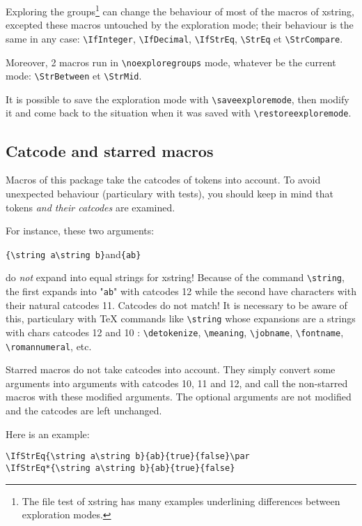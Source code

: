 \documentclass[english,a4paper,10pt]{article}
\newcommand\Xstring{\textsf{xstring}\xspace}
\newcommand\styleexercice{\footnotesize}
\newcommand\verbinline{\lstinline[basicstyle=\normalsize\ttfamily]}
\begin{document}
Exploring the groups\footnote{The file test of \Xstring has many examples underlining differences between exploration modes.} can change the behaviour of most of the macros of \Xstring, excepted these macros untouched by the exploration mode; their behaviour is the same in any case: \verbinline|\IfInteger|, \verbinline|\IfDecimal|, \verbinline|\IfStrEq|, \verbinline|\StrEq| et \verbinline|\StrCompare|.

Moreover, 2 macros run in \verbinline|\noexploregroups| mode, whatever be the current mode: \verbinline|\StrBetween| et \verbinline|\StrMid|.\medskip

It is possible to save the exploration mode with \verbinline|\saveexploremode|, then modify it and come back to the situation when it was saved with \verbinline|\restoreexploremode|.

\subsection{Catcode and starred macros}
\label{macrosetoilees}
Macros of this package take the catcodes of tokens into account. To avoid unexpected behaviour (particulary with tests), you should keep in mind that tokens \emph{and their catcodes} are examined.\medskip

For instance, these two arguments:\par\medskip
\hfil\verbinline|{\string a\string b}|\qquad and\qquad\verb|{ab}|\hfil{}\par\smallskip
do \emph{not} expand into equal strings for xstring! Because of the command \verbinline|\string|, the first expands into "\verb|ab|" with catcodes 12 while the second have characters with their natural catcodes 11. Catcodes do not match! It is necessary to be aware of this, particulary with \TeX{} commands like \verbinline|\string| whose expansions are a strings with chars catcodes 12 and 10 : \verbinline|\detokenize|, \verbinline|\meaning|, \verbinline|\jobname|, \verbinline|\fontname|, \verbinline|\romannumeral|, etc.\medskip

Starred macros do not take catcodes into account. They simply convert some arguments into arguments with catcodes 10, 11 and 12, and call the non-starred macros with these modified arguments. The optional arguments are not modified and the catcodes are left unchanged.\medskip

Here is an example:\par\nobreak\smallskip
\begin{minipage}[c]{0.65\linewidth}
\begin{lstlisting}
\IfStrEq{\string a\string b}{ab}{true}{false}\par
\IfStrEq*{\string a\string b}{ab}{true}{false}
\end{lstlisting}%
\end{minipage}\hfill
\begin{minipage}[c]{0.35\linewidth}
	\styleexercice
	\par
\end{minipage}%
\smallskip
\end{document}
